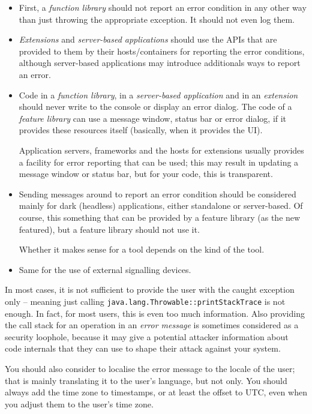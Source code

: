 \begin{itemize}
\item{First, a \textit{function library} should not report an error condition in any other way than just throwing the appropriate exception. It should not even log them.}

\item{\textit{Extensions} and \textit{server-based applications} should use the APIs that are provided to them by their hosts/containers for reporting the error conditions, although server-based applications may introduce additionals ways to report an error.}

\item{Code in a \textit{function library}, in a \textit{server-based application} and in an \textit{extension} should never write to the console or display an error dialog. The code of a \textit{feature library} can use a message window, status bar or error dialog, if it provides these resources itself (basically, when it provides the UI).

Application servers, frameworks and the hosts for extensions usually provides a facility for error reporting that can be used; this may result in updating a message window or status bar, but for your code, this is transparent.}

\item{Sending messages around to report an error condition should be considered mainly for dark (headless) applications, either standalone or server-based. Of course, this something that can be provided by a feature library (as the new featured), but a feature library should not use it.

Whether it makes sense for a tool depends on the kind of the tool.}

\item{Same for the use of external signalling devices.}
\end{itemize}

In most cases, it is not sufficient to provide the user with the caught exception only – meaning just calling \lstinline|java.lang.Throwable::printStackTrace| is not enough. In fact, for most users, this is even too much information. Also providing the call stack for an operation in an \textit{error message} is sometimes considered as a security loophole, because it may give a potential attacker information about code internals that they can use to shape their attack against your system.

You should also consider to localise the error message to the locale of the user; that is mainly translating it to the user's language, but not only. You should always add the time zone to timestamps, or at least the offset to UTC, even when you adjust them to the user's time zone.

